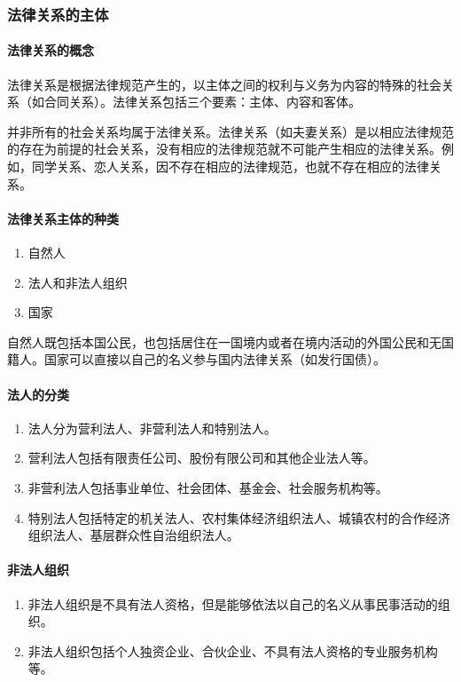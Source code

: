 \documentclass[UTF8,12pt]{ctexart}
\numberwithin{equation}{section} %
\numberwithin{figure}{section}
\numberwithin{table}{section}
\begin{document}
	\subsubsection{法律关系的主体}
	\paragraph{法律关系的概念}
	法律关系是根据法律规范产生的，以主体之间的权利与义务为内容的特殊的社会关系（如合同关系）。法律关系包括三个要素：主体、内容和客体。
	
	并非所有的社会关系均属于法律关系。法律关系（如夫妻关系）是以相应法律规范的存在为前提的社会关系，没有相应的法律规范就不可能产生相应的法律关系。例如，同学关系、恋人关系，因不存在相应的法律规范，也就不存在相应的法律关系。
	
	\paragraph{法律关系主体的种类}
	\begin{enumerate}
		\item 自然人
		
		\item 法人和非法人组织
		
		\item 国家
	\end{enumerate}

	自然人既包括本国公民，也包括居住在一国境内或者在境内活动的外国公民和无国籍人。国家可以直接以自己的名义参与国内法律关系（如发行国债）。
	
	\paragraph{法人的分类}
	\begin{enumerate}
		\item 法人分为营利法人、非营利法人和特别法人。
		
		\item 营利法人包括有限责任公司、股份有限公司和其他企业法人等。
		
		\item 非营利法人包括事业单位、社会团体、基金会、社会服务机构等。
		
		\item 特别法人包括特定的机关法人、农村集体经济组织法人、城镇农村的合作经济组织法人、基层群众性自治组织法人。
	\end{enumerate}
	
	\paragraph{非法人组织}
	\begin{enumerate}
		\item 非法人组织是不具有法人资格，但是能够依法以自己的名义从事民事活动的组织。
	
		\item 非法人组织包括个人独资企业、合伙企业、不具有法人资格的专业服务机构等。
	\end{enumerate}
	
\end{document}
